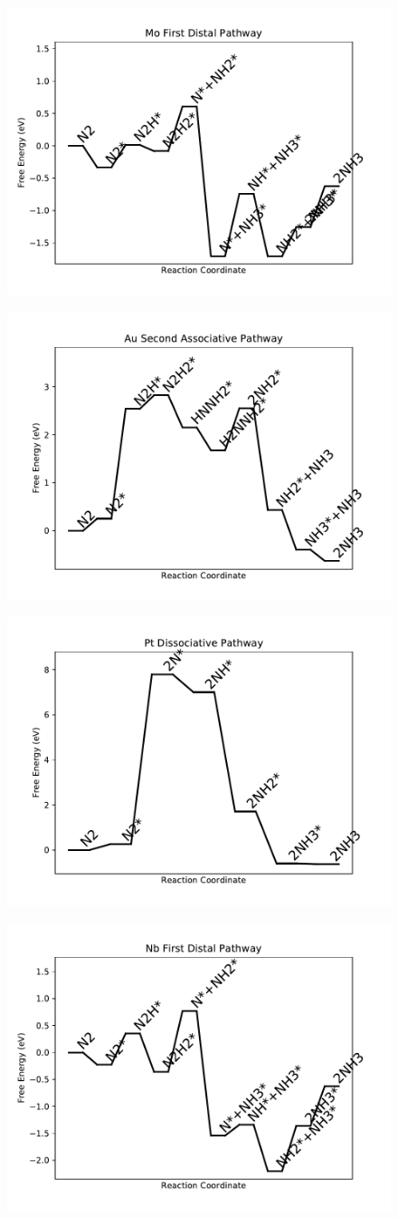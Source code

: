 \documentclass[journal=jacsat,manuscript=article]{achemso}
\begin{document}
\begin{figure}
\includegraphics[width=0.5\linewidth]{data/plots/Mo_distal_1.pdf}
\label{fig:Mo_distal_1}
\end{figure}

\begin{figure}
\includegraphics[width=0.5\linewidth]{data/plots/Au_associative_2.pdf}
\label{fig:Au_associative_2}
\end{figure}

\begin{figure}
\includegraphics[width=0.5\linewidth]{data/plots/Pt_dissociative.pdf}
\label{fig:Pt_dissociative}
\end{figure}

\begin{figure}
\includegraphics[width=0.5\linewidth]{data/plots/Nb_distal_1.pdf}
\label{fig:Nb_distal_1}
\end{figure}
\end{document}
